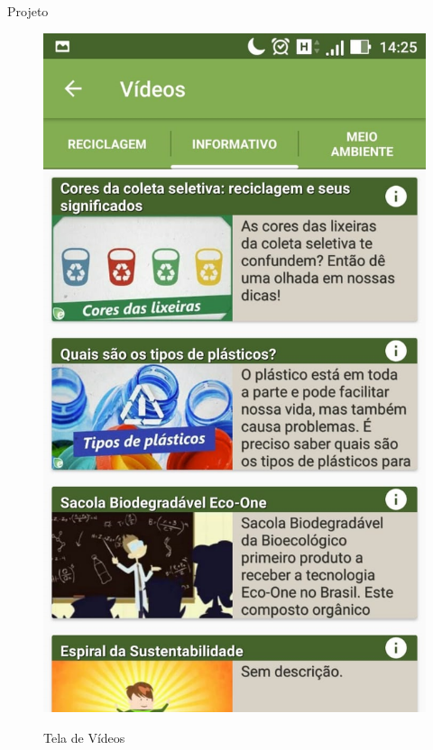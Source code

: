 \documentclass[
	12pt,				%
	openany,			%
	twoside,			%
	a4paper,			%
	english,			%
	french,				%
	spanish,			%
	brazil				%
	]{abntex2}
\begin{document}
\begin{chapter}{Projeto}
\begin{figure}[htb]
\begin{minipage}{0.45\textwidth}
     \label{fig:tela_videos_1}
  \end{minipage}
  \hfill
  \begin{minipage}{0.45\textwidth}
    \centering
    \caption{Tela de Vídeos}
    \includegraphics[scale=0.35]{media/tela_videos_2.jpg}
     \label{fig:tela_videos_2}
  \end{minipage}
\end{figure}


\end{chapter}
\end{document}
